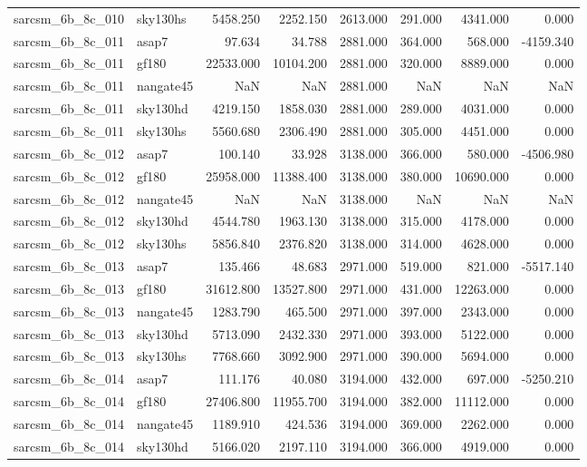 \begin{tabular}{llrrrrrr}
sarcsm\_6b\_8c\_010 & sky130hs & 5458.250 & 2252.150 & 2613.000 & 291.000 & 4341.000 & 0.000 \\
sarcsm\_6b\_8c\_011 & asap7 & 97.634 & 34.788 & 2881.000 & 364.000 & 568.000 & -4159.340 \\
sarcsm\_6b\_8c\_011 & gf180 & 22533.000 & 10104.200 & 2881.000 & 320.000 & 8889.000 & 0.000 \\
sarcsm\_6b\_8c\_011 & nangate45 & NaN & NaN & 2881.000 & NaN & NaN & NaN \\
sarcsm\_6b\_8c\_011 & sky130hd & 4219.150 & 1858.030 & 2881.000 & 289.000 & 4031.000 & 0.000 \\
sarcsm\_6b\_8c\_011 & sky130hs & 5560.680 & 2306.490 & 2881.000 & 305.000 & 4451.000 & 0.000 \\
sarcsm\_6b\_8c\_012 & asap7 & 100.140 & 33.928 & 3138.000 & 366.000 & 580.000 & -4506.980 \\
sarcsm\_6b\_8c\_012 & gf180 & 25958.000 & 11388.400 & 3138.000 & 380.000 & 10690.000 & 0.000 \\
sarcsm\_6b\_8c\_012 & nangate45 & NaN & NaN & 3138.000 & NaN & NaN & NaN \\
sarcsm\_6b\_8c\_012 & sky130hd & 4544.780 & 1963.130 & 3138.000 & 315.000 & 4178.000 & 0.000 \\
sarcsm\_6b\_8c\_012 & sky130hs & 5856.840 & 2376.820 & 3138.000 & 314.000 & 4628.000 & 0.000 \\
sarcsm\_6b\_8c\_013 & asap7 & 135.466 & 48.683 & 2971.000 & 519.000 & 821.000 & -5517.140 \\
sarcsm\_6b\_8c\_013 & gf180 & 31612.800 & 13527.800 & 2971.000 & 431.000 & 12263.000 & 0.000 \\
sarcsm\_6b\_8c\_013 & nangate45 & 1283.790 & 465.500 & 2971.000 & 397.000 & 2343.000 & 0.000 \\
sarcsm\_6b\_8c\_013 & sky130hd & 5713.090 & 2432.330 & 2971.000 & 393.000 & 5122.000 & 0.000 \\
sarcsm\_6b\_8c\_013 & sky130hs & 7768.660 & 3092.900 & 2971.000 & 390.000 & 5694.000 & 0.000 \\
sarcsm\_6b\_8c\_014 & asap7 & 111.176 & 40.080 & 3194.000 & 432.000 & 697.000 & -5250.210 \\
sarcsm\_6b\_8c\_014 & gf180 & 27406.800 & 11955.700 & 3194.000 & 382.000 & 11112.000 & 0.000 \\
sarcsm\_6b\_8c\_014 & nangate45 & 1189.910 & 424.536 & 3194.000 & 369.000 & 2262.000 & 0.000 \\
sarcsm\_6b\_8c\_014 & sky130hd & 5166.020 & 2197.110 & 3194.000 & 366.000 & 4919.000 & 0.000 \\

\end{tabular}
